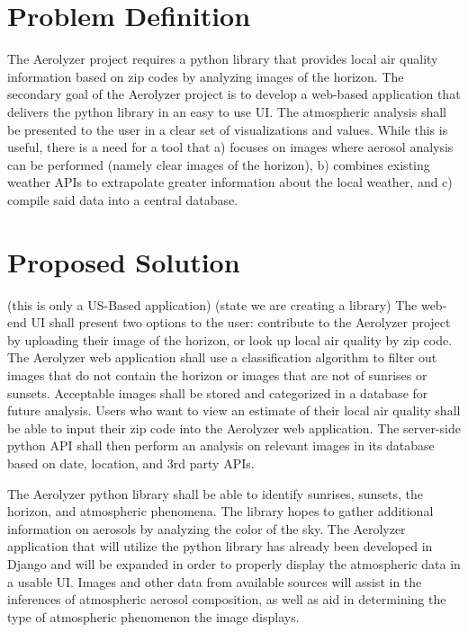 \documentclass[letterpaper,10pt,draftclsnofoot,onecolumn]{IEEEtran}
\begin{document}
\clearpage
\begin{flushleft}
\section{Problem Definition}
The Aerolyzer project requires a python library that provides local air quality information based on zip codes by analyzing images of the horizon. The secondary goal of the Aerolyzer project is to develop a web-based application that delivers the python library in an easy to use UI. The atmospheric analysis shall be presented to the user in a clear set of visualizations and values. While this is useful, there is a need for a tool that a) focuses on images where aerosol analysis can be performed (namely clear images of the horizon), b) combines existing weather APIs to extrapolate greater information about the local weather, and c) compile said data into a central database.

\section{Proposed Solution} (this is only a US-Based application) (state we are creating a library)
The web-end UI shall present two options to the user: contribute to the Aerolyzer project by uploading their image of the horizon, or look up local air quality by zip code. The Aerolyzer web application shall use a classification algorithm to filter out images that do not contain the horizon or images that are not of sunrises or sunsets. Acceptable images shall be stored and categorized in a database for future analysis. Users who want to view an estimate of their local air quality shall be able to input their zip code into the Aerolyzer web application. The server-side python API shall then perform an analysis on relevant images in its database based on date, location, and 3rd party APIs. \par The Aerolyzer python library shall be able to identify sunrises, sunsets, the horizon, and atmospheric phenomena. The library hopes to gather additional information on aerosols by analyzing the color of the sky. The Aerolyzer application that will utilize the python library has already been developed in Django and will be expanded in order to properly display the atmospheric data in a usable UI. Images and other data from available sources will assist in the inferences of atmospheric aerosol composition, as well as aid in determining the type of atmospheric phenomenon the image displays.


\end{flushleft}
\end{document}
